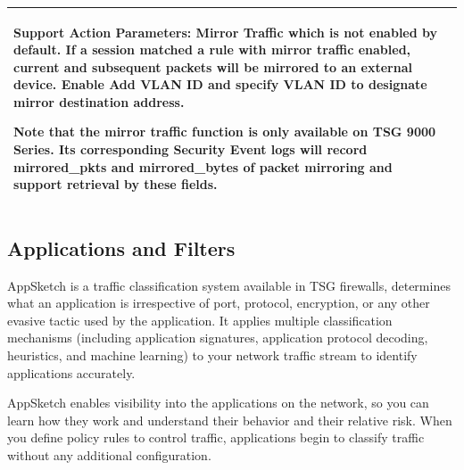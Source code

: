 \begin{longtable}{p{}|p{}}
    Support Action Parameters: \textbf{Mirror Traffic} which is not enabled by default. If a session matched a rule with mirror traffic enabled, current and subsequent packets will be mirrored to an external device. Enable Add VLAN ID and specify VLAN ID to designate mirror destination address.


    Note that the mirror traffic function is only available on TSG 9000 Series. Its corresponding Security Event logs will record mirrored\_pkts and mirrored\_bytes of packet mirroring and support retrieval by these fields. 
    \\\hline 
\end{longtable}

\subsection*{\hypertarget{link:Security Applications and Filters}{Applications and Filters}}
\label{sec:policies:security:filter}

AppSketch is a traffic classification system available in TSG firewalls, determines what an application is irrespective of port, protocol, 
encryption, or any other evasive tactic used by the application. It applies multiple classification mechanisms (including application signatures, 
application protocol decoding, heuristics, and machine learning) to your network traffic stream to identify applications accurately.


AppSketch enables visibility into the applications on the network, so you can learn how they work and understand their behavior and their relative risk. When you define policy rules to control traffic, applications begin to classify traffic without any additional configuration.


